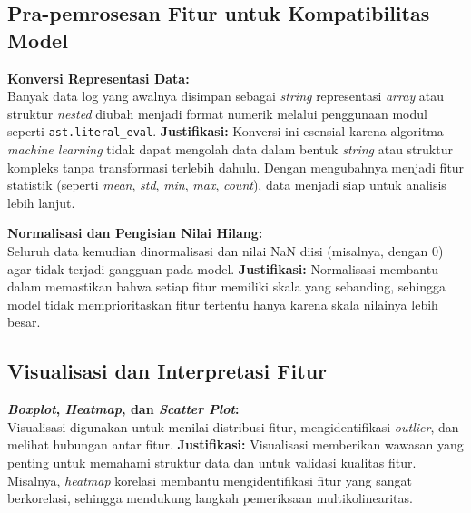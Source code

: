 \subsection{Pra-pemrosesan Fitur untuk Kompatibilitas Model}
\label{sec:praPemrosesanFitur}
\textbf{Konversi Representasi Data:} \\
Banyak data log yang awalnya disimpan sebagai \textit{string} representasi \textit{array} atau struktur \textit{nested} diubah menjadi format numerik melalui penggunaan modul seperti \texttt{ast.literal\_eval}.
\textbf{Justifikasi:} Konversi ini esensial karena algoritma \textit{machine learning} tidak dapat mengolah data dalam bentuk \textit{string} atau struktur kompleks tanpa transformasi terlebih dahulu. Dengan mengubahnya menjadi fitur statistik (seperti \textit{mean}, \textit{std}, \textit{min}, \textit{max}, \textit{count}), data menjadi siap untuk analisis lebih lanjut.

\textbf{Normalisasi dan Pengisian Nilai Hilang:} \\
Seluruh data kemudian dinormalisasi dan nilai NaN diisi (misalnya, dengan 0) agar tidak terjadi gangguan pada model.
\textbf{Justifikasi:} Normalisasi membantu dalam memastikan bahwa setiap fitur memiliki skala yang sebanding, sehingga model tidak memprioritaskan fitur tertentu hanya karena skala nilainya lebih besar.

\subsection{Visualisasi dan Interpretasi Fitur}
\label{sec:visualisasiInterpretasiFitur}
\textbf{\textit{Boxplot}, \textit{Heatmap}, dan \textit{Scatter Plot}:} \\
Visualisasi digunakan untuk menilai distribusi fitur, mengidentifikasi \textit{outlier}, dan melihat hubungan antar fitur.
\textbf{Justifikasi:} Visualisasi memberikan wawasan yang penting untuk memahami struktur data dan untuk validasi kualitas fitur. Misalnya, \textit{heatmap} korelasi membantu mengidentifikasi fitur yang sangat berkorelasi, sehingga mendukung langkah pemeriksaan multikolinearitas.

